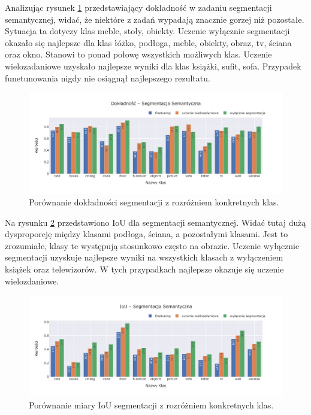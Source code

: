 \vspace{0.5cm}
Analizując rysunek \ref{fig:segmentation-acc} przedstawiający dokładność w zadaniu segmentacji semantycznej, widać, że niektóre z zadań wypadają znacznie gorzej niż pozostałe. Sytuacja ta dotyczy klas meble, stoły, obiekty. Uczenie wyłącznie segmentacji okazało się najlepsze dla klas łóżko, podłoga, meble, obiekty, obraz, tv, ściana oraz okno. Stanowi to ponad połowę wszystkich możliwych klas. Uczenie wielozadaniowe uzyskało najlepsze wyniki dla klas książki, sufit, sofa. Przypadek funetunowania nigdy nie osiągnął najlepszego rezultatu.
\begin{figure}[ht!]
    \centering
    \includegraphics[width=\textwidth]{img/pl-res/Dokladnosc-Segmentacja-Semantyczna.jpeg}
    \caption{Porównanie dokładności segmentacji z rozróżniem konkretnych klas.}
    \label{fig:segmentation-acc}
\end{figure}

Na rysunku \ref{fig:segmentation-iou} przedstawiono IoU dla segmentacji semantycznej. Widać tutaj dużą dysproporcję między klasami podłoga, ściana, a pozostałymi klasami. Jest to zrozumiałe, klasy te występują stosunkowo często na obrazie. Uczenie wyłącznie segmentacji uzyskuje najlepsze wyniki na wszystkich klasach z wyłączeniem książek oraz telewizorów. W tych przypadkach najlepsze okazuje się uczenie wielozdaniowe.

\begin{figure}[ht!]
    \centering
    \includegraphics[width=\textwidth]{img/pl-res/IoU-Segmentacja-Semantyczna.jpeg}
    \caption{Porównanie miary IoU segmentacji z rozróżniem konkretnych klas.}
    \label{fig:segmentation-iou}
    
\end{figure}
